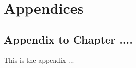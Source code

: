 \chapter{Appendices}
\label{appendix}

\section{Appendix to Chapter ....}
\label{sec:label_to_appendix1}
\setcounter{table}{0}
\setcounter{figure}{0}
\renewcommand{\thetable}{A3.\arabic{table}}
\renewcommand{\thefigure}{A3.\arabic{figure}}

This is the appendix ...










